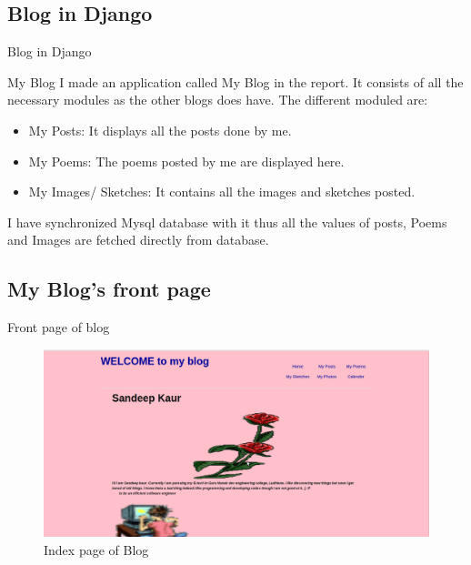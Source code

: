 
\subsection{Blog in Django}
\begin{frame}{Blog in Django}
\begin{block}{My Blog}
I made an application called My Blog in the report. It consists of all the necessary modules as the other blogs does have.
The different moduled are:
\begin{itemize}
\item My Posts: It displays all the posts done by me.
\item My Poems: The poems posted by me are displayed here.
\item My Images/ Sketches: It contains all the images and sketches posted.
\end{itemize}
I have synchronized Mysql database with it thus all the values of posts, Poems and Images are fetched directly from database.
\end{block}
\end{frame}
\newpage
\subsection{My Blog's front page}
\begin{frame}{Front page of blog}
\begin{figure}[h]
\centering \includegraphics[scale=0.2]{bg.png}
\caption{Index page of Blog}
\end{figure}
\end{frame}

